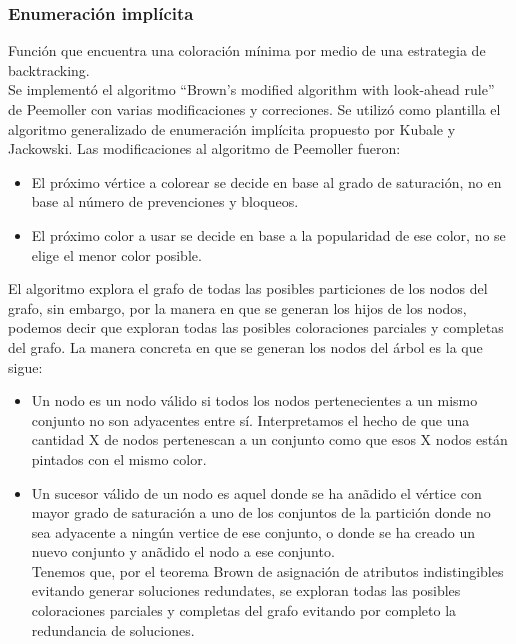 \documentclass[a4paper,10pt]{article}
\begin{document}
\subsubsection{Enumeraci\'on impl\'icita}
Funci\'on que encuentra una coloraci\'on m\'inima por medio de una
estrategia de backtracking.\\

\indent Se implement\'o el algoritmo ``Brown's modified algorithm with
look-ahead rule'' de Peemoller con varias modificaciones y
correciones. Se utiliz\'o como plantilla el algoritmo generalizado de
enumeraci\'on impl\'icita propuesto por Kubale y Jackowski. Las
modificaciones al algoritmo de Peemoller fueron:
\begin{itemize}
\item El pr\'oximo v\'ertice a colorear se decide en base al grado de
      saturaci\'on, no en base al n\'umero de prevenciones y bloqueos.
\item El pr\'oximo color a usar se decide en base a la popularidad de
      ese color, no se elige el menor color posible.
\end{itemize}

\indent El algoritmo explora el grafo de todas las posibles particiones
de los nodos del grafo, sin embargo, por la manera en que se generan los
hijos de los nodos, podemos decir que exploran todas las posibles
coloraciones parciales y completas del grafo. La manera concreta en que
se generan los nodos del \'arbol es la que sigue:
\begin{itemize}
 \item Un nodo es un nodo v\'alido si todos los nodos
       pertenecientes a un mismo conjunto no son adyacentes entre
       s\'i. Interpretamos el hecho de que una cantidad X de
       nodos pertenescan a un conjunto como que esos X nodos
       est\'an pintados con el mismo color.
 \item Un sucesor v\'alido de un nodo es aquel donde se ha an\~adido el
       v\'ertice con mayor grado de saturaci\'on a uno de los conjuntos de la
       partici\'on donde no sea adyacente a ning\'un vertice de ese
       conjunto, o donde se ha creado un nuevo conjunto y an\~adido el
       nodo a ese conjunto.\\
       \indent Tenemos que, por el teorema Brown de asignaci\'on de atributos
       indistingibles evitando generar soluciones redundates, se
       exploran todas las posibles coloraciones parciales y completas
       del grafo evitando por completo la redundancia de soluciones.
\end{itemize}
\end{document}

